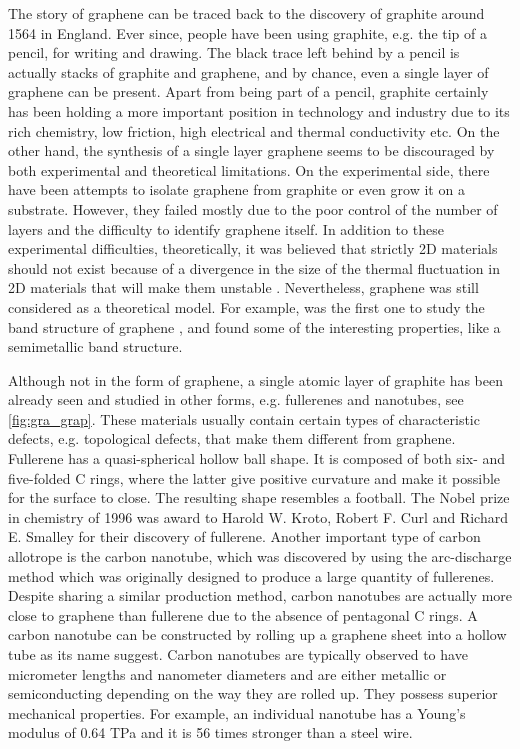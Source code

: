 The story of graphene can be traced back to the discovery of graphite around 1564 in England\cite{petroski1990pencil}. Ever since, people have been using graphite, e.g. the tip of a pencil, for writing and drawing. The black trace left behind by a pencil is actually stacks of graphite and graphene, and by chance, even a single layer of graphene can be present.  Apart from being part of a pencil, graphite certainly has been holding a more important position in technology and industry due to its rich chemistry, low friction, high electrical and thermal conductivity etc. On the other hand, the synthesis of a single layer graphene seems to be discouraged by both experimental and theoretical limitations. On the experimental side, there have been attempts\cite{Krishnan1997,Ohashi1997,Dresselhaus2002,Shioyama2001} to isolate graphene from graphite or even grow it on a substrate. However, they failed mostly due to the poor control of the number of layers and the difficulty to identify graphene itself.  In addition to these experimental difficulties, theoretically, it was believed that strictly 2D materials should not exist because of a divergence in the size of the thermal fluctuation in 2D materials that will make them unstable \cite{Peierls1935,Landau1937,Mermin1968}. Nevertheless, graphene was still considered as a theoretical model. For example, \citet{Wallace1947} was the first one to study the band structure of graphene \cite{CastroNeto2009}, and found some of the interesting properties, like a semimetallic band structure. 

Although not in the form of graphene, a single atomic layer of graphite has been already seen and studied in other forms, e.g. fullerenes and nanotubes, see \autoref{fig:gra_grap}. These materials usually contain certain types of characteristic defects, e.g. topological defects, that make them different from graphene.  Fullerene has a quasi-spherical hollow ball shape. It is composed of both six- and five-folded C rings, where the latter give positive curvature and make it possible for the surface to close. The resulting shape resembles a football\cite{Kroto1985,Lamb1990}. The Nobel prize in chemistry of 1996 was award to Harold W. Kroto, Robert F. Curl and Richard E. Smalley for their discovery of fullerene. Another important type of carbon allotrope is the carbon nanotube\cite{Iijima1993}, which was discovered by using the arc-discharge method\cite{Lamb1990} which was originally designed to produce a large quantity of fullerenes. Despite sharing a similar production method, carbon nanotubes are actually more close to graphene than fullerene due to the absence of pentagonal C rings. A carbon nanotube can be constructed by rolling up a graphene sheet into a hollow tube as its name suggest. Carbon nanotubes are typically observed to have micrometer lengths and nanometer diameters and are either metallic or semiconducting depending on the way they are rolled up. They possess superior mechanical properties. For example, an individual nanotube has a Young's modulus of 0.64 TPa and it is 56 times stronger than a steel wire\cite{Baughman787}.

